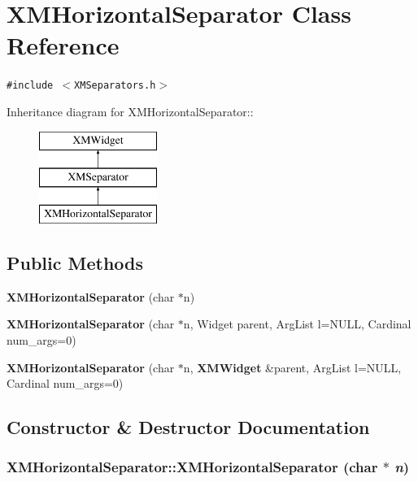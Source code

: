 \section{XMHorizontal\-Separator  Class Reference}
\label{classXMHorizontalSeparator}
{\tt \#include $<$XMSeparators.h$>$}

Inheritance diagram for XMHorizontal\-Separator::\begin{figure}[H]
\begin{center}
\leavevmode
\includegraphics[height=3cm]{classXMHorizontalSeparator}
\end{center}
\end{figure}
\subsection*{Public Methods}
\begin{CompactItemize}
\item 
{\bf XMHorizontal\-Separator} (char $\ast$n)
\item 
{\bf XMHorizontal\-Separator} (char $\ast$n, Widget parent, Arg\-List l=NULL, Cardinal num\_\-args=0)
\item 
{\bf XMHorizontal\-Separator} (char $\ast$n, {\bf XMWidget} \&parent, Arg\-List l=NULL, Cardinal num\_\-args=0)
\end{CompactItemize}


\subsection{Constructor \& Destructor Documentation}
\subsubsection{\setlength{\rightskip}{0pt plus 5cm}XMHorizontal\-Separator::XMHorizontal\-Separator (char $\ast$ {\em n})\hspace{0.3cm}{\tt  [inline]}}\label{classXMHorizontalSeparator_a0}




